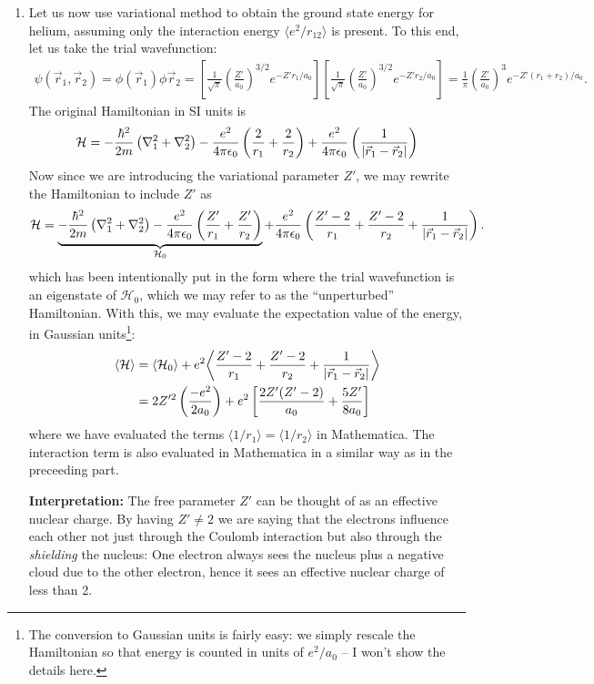 \documentclass{book}
\theoremstyle{definition}
\newcommand{\ham}{\mathcal{H}}
\newcommand{\f}[2]{\frac{#1}{#2}}
\newcommand{\lp}{\left(}
\newcommand{\rp}{\right)}
\newcommand{\lb}{\left[}
\newcommand{\rb}{\right]}
\begin{document}
\begin{enumerate}[label=(\alph*)]
	\item Let us now use variational method to obtain the ground state energy for helium, assuming only the interaction energy $\langle e^2/r_{12}\rangle$ is present. To this end, let us take the trial wavefunction:
	\begin{align*}
		\psi(\vec{r}_1, \vec{r}_2) = \phi(\vec{r}_1)\phi{\vec{r}_2} = \lb \f{1}{\sqrt{\pi} } \lp \f{Z'}{a_0}\rp^{3/2} e^{-Z'r_1/a_0} \rb \lb \f{1}{\sqrt{\pi} } \lp \f{Z'}{a_0}\rp^{3/2} e^{-Z'r_2/a_0} \rb = \f{1}{\pi}\lp \f{Z'}{a_0} \rp^3 e^{-Z'(r_1 + r_2)/a_0}.
	\end{align*}
	The original Hamiltonian in SI units is 
	\begin{align*}
		\ham = -\f{\hbar^2}{2m}\lp \nabla^2_1 + \nabla_2^2  \rp - \f{e^2}{4\pi \epsilon_0}\lp \f{2}{r_1} + \f{2}{r_2}\rp  +  \f{e^2}{4\pi \epsilon_0}\lp \f{1}{\abs{\vec{r}_1 - \vec{r}_2}}\rp 
	\end{align*}
	Now since we are introducing the variational parameter $Z'$, we may rewrite the Hamiltonian to include $Z'$ as 
	\begin{align*}
		\ham = \underbrace{-\f{\hbar^2}{2m}\lp \nabla^2_1 + \nabla_2^2  \rp - \f{e^2}{4\pi \epsilon_0}\lp \f{Z'}{r_1} + \f{Z'}{r_2}\rp}_{\ham_0}  +  \f{e^2}{4\pi \epsilon_0}\lp \f{Z'-2}{r_1} + \f{Z'-2}{r_2} + \f{1}{\abs{\vec{r}_1 - \vec{r}_2}}\rp.
	\end{align*}
	which has been intentionally put in the form where the trial wavefunction is an eigenstate of $\ham_0$, which we may refer to as the ``unperturbed'' Hamiltonian. With this, we may evaluate the expectation value of the energy, in Gaussian units\footnote{The conversion to Gaussian units is fairly easy: we simply rescale the Hamiltonian so that energy is counted in units of $e^2/a_0$ -- I won't show the details here.}:
	\begin{align*}
		\langle \ham \rangle 
		&= \langle \ham_0 \rangle + e^2 \bigg\langle \f{Z'-2}{r_1} + \f{Z'-2}{r_2} + \f{1}{\abs{\vec{r}_1 - \vec{r}_2}} \bigg\rangle \\
		&= 2Z'^2 \lp \f{-e^2}{2a_0} \rp + e^2 \lb \f{2Z'(Z'-2)}{a_0} + \f{5Z'}{8a_0}  \rb
	\end{align*} 
	where we have evaluated the terms $\langle 1/r_1\rangle = \langle 1/r_2\rangle$ in Mathematica. The interaction term is also evaluated in Mathematica in a similar way as in the preceeding part. 
	
	
	\textbf{Interpretation:} The free parameter $Z'$ can be thought of as an effective nuclear charge. By having $Z'\neq 2$ we are saying that the electrons influence each other not just through the Coulomb interaction but also through the \textit{shielding} the nucleus: One electron always sees the nucleus plus a negative cloud due to the other electron, hence it sees an effective nuclear charge of less than 2. 
	

\end{enumerate}
\end{document}
